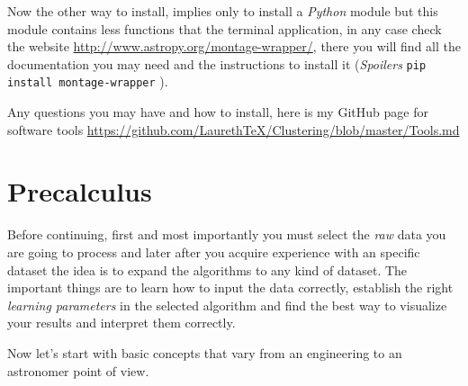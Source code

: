 \documentclass[11pt,fleqn]{book} %
\begin{document}
\begin{description}
\begin{enumerate}
    \end{enumerate}
    
    
    
      Now the other way to install, implies only to install a \emph{Python} module but this module contains less functions that the terminal application, in any case check the website \url{http://www.astropy.org/montage-wrapper/}, there you will find all the documentation you may need and the instructions to install it (\emph{Spoilers} \verb|pip install montage-wrapper| ).\\
\end{description}

Any questions you may have and how to install, here is my GitHub page for software tools \url{https://github.com/LaurethTeX/Clustering/blob/master/Tools.md}


\chapter{Precalculus}

Before continuing, first and most importantly you must select the \emph{raw} data you are going to process and later after you acquire experience with an specific dataset the idea is to expand the algorithms to any kind of dataset. The important things are to learn how to input the data correctly, establish the right \emph{learning parameters} in the selected algorithm and find the best way to visualize your results and interpret them correctly.

Now let's start with basic concepts that vary from an engineering to an astronomer point of view.
\end{document}
